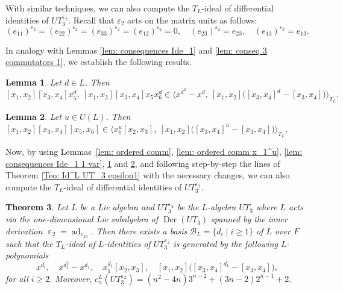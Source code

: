 \documentclass[a4paper,reqno]{amsart}
\newtheorem{theorem}{Theorem}
\newtheorem{lemma}[theorem]{Lemma}
\theoremstyle{definition}
\numberwithin{equation}{section}
\numberwithin{theorem}{section}
\DeclareMathOperator{\e}{\varepsilon}
\DeclareMathOperator{\ad}{ad}
\DeclareMathOperator{\D}{Der}
\begin{document}
With similar techniques, we can also compute the $T_L$-ideal of differential identities of $UT_3^{\e_2}.$ Recall that $ \varepsilon_2 $ acts on the matrix units as follows:
\begin{equation}
  (e_{11})^{\varepsilon_2} = (e_{22})^{\varepsilon_2} = (e_{33})^{\varepsilon_2} = (e_{12})^{\varepsilon_2} = 0, \quad (e_{23})^{\varepsilon_2} = e_{23}, \quad (e_{13})^{\varepsilon_2} = e_{13}. \label{eq: e2}
\end{equation}



In analogy with Lemmas \ref{lem: consequences Ide_1} and \ref{lem: conseq 3 commutators 1}, we establish the following results.

\begin{lemma}\label{lem: consequences Ide_2}
    Let $d\in L$. Then
   $$[x_1,x_2][x_3,x_4]x_5^{d}, \ [x_1,x_2][x_3,x_4]x_5x_6^{d}\in \langle  x^{d^2}-x^{d}, \ [x_1,x_2]\big([x_3,x_4]^{d}-[x_3,x_4]\big)\rangle_{T_L}.$$
\end{lemma}

\begin{lemma}\label{lem: conseq 3 commutators 2}
    Let $u\in U(L)$. Then $[x_1,x_2][x_3,x_4][x_5,x_6]\in \langle x_1^{u} [x_2,x_3],\ [x_1,x_2]\big([x_3,x_4]^{u}-[x_3,x_4]\big) \rangle_{T_L}$.
\end{lemma}






Now, by using Lemmas~\ref{lem: ordered comm}, \ref{lem: ordered comm x_1^u}, \ref{lem: consequences Ide_1 1 var}, \ref{lem: consequences Ide_2} and  \ref{lem: conseq 3 commutators 2}, and following step-by-step the lines of Theorem \ref{Teo: Id^L UT_3 epsilon1} with the necessary changes, we can also compute the $T_L$-ideal of differential identities of $UT_3^{\e_2}.$

\begin{theorem}\label{Teo: Id^L UT_3 epsilon2}
Let $L$ be a Lie algebra and $UT_3^{\e_2}$  be the $L$-algebra $UT_3$ where $L$ acts via the one-dimensional Lie subalgebra of $\D(UT_3)$ spanned by the inner derivation $\e_2=\ad_{e_{33}}$. Then  
there exists a basis $\mathcal{B}_L=\{d_i \mid i \geq 1\}$ of $L$ over $F$ such that 
the $T_L$-ideal of $L$-identities of $UT_3^{\e_2}$ is generated by the following $L$-polynomials
$$x^{d_i}, \quad x^{d_1^2}-x^{d_1}, \quad  x_1^{d_1}[x_2,x_3], \quad [x_1,x_2] \big([x_3,x_4]^{d_1}-[x_3,x_4]\big),$$
for all $i\geq 2.$ Moreover, $c_n^L(UT_3^{\e_2})= (n^2-4n) 3^{n-2}+ (3n-2)2^{n-1}+2.$
\end{theorem}
\end{document}
